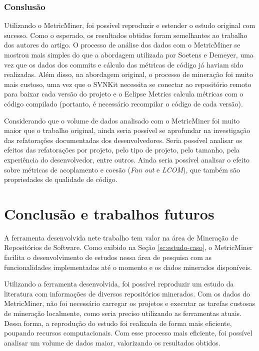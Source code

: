 \documentclass[a4paper, 12pt, twoside]{book}
\begin{document}
        \subsection*{Conslusão}
        Utilizando o MetricMiner, foi possível reproduzir e estender o estudo original com sucesso. Como o esperado, os resultados obtidos foram semelhantes ao trabalho dos autores do artigo. O processo de análise dos dados com o MetricMiner se mostrou mais simples do que a abordagem utilizada por Soetens e Demeyer, uma vez que os dados dos commits e cálculo das métricas de código já haviam sido realizadas. Além disso, na abordagem original, o processo de mineração foi muito mais custoso, uma vez que o SVNKit necessita se conectar ao repositório remoto para baixar cada versão do projeto e o Eclipse Metrics calcula métricas com o código compilado (portanto, é necessário recompilar o código de cada versão).

        Considerando que o volume de dados analisado com o MetricMiner foi muito maior que o trabalho original, ainda seria possível se aprofundar na investigação das refatorações documentadas dos desenvolvedores. Seria possível analisar os efeitos das refatorações por projeto, pelo tipo de projeto, pelo tamanho, pela experiência do desenvolvedor, entre outros. Ainda seria possível analisar o efeito sobre métricas de acoplamento e coesão (\textit{Fan out} e \textit{LCOM}), que também são propriedades de qualidade de código.

\chapter{Conclusão e trabalhos futuros} \label{ch:conclusao}
    
        A ferramenta desenvolvida nete trabalho tem valor na área de Mineração de Repositórios de Software. Como exibido na Seção \ref{sc:estudo-caso}, o MetricMiner facilita o desenvolvimento de estudos nessa área de pesquisa com as funcionalidades implementadas até o momento e os dados minerados disponíveis.

        Utilizando a ferramenta desenvolvida, foi possível reproduzir um estudo da literatura com informações de diversos repositórios minerados. Com os dados do MetricMiner, não foi necessário carregar os projetos e executar as tarefas custosas de mineração localmente, como seria preciso utilizando as ferramentas atuais. Dessa forma, a reprodução do estudo foi realizada de forma mais eficiente, poupando recursos computacionais. Com esse processo mais eficiente, foi possível analisar um volume de dados maior, valorizando os resultados obtidos.
\end{document}
